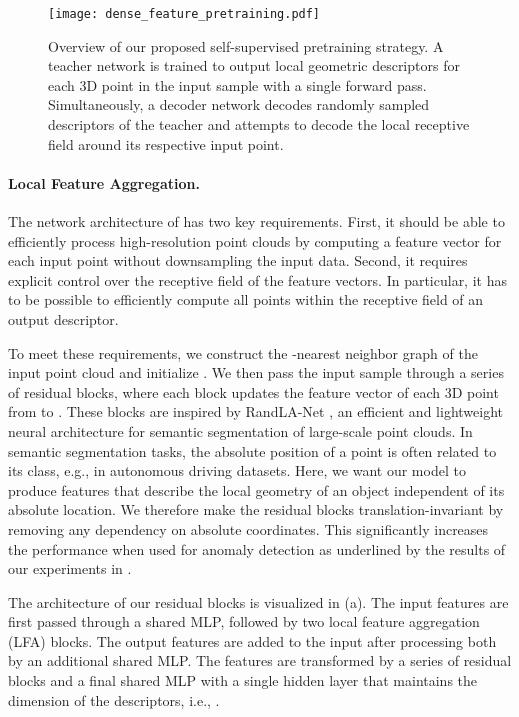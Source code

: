 \documentclass[twoside,11pt]{article}
\begin{document}
\begin{figure}[ht]
    \centering
\texttt{[image: dense\_feature\_pretraining.pdf]}
    \caption{Overview of our proposed self-supervised pretraining strategy. A teacher network is trained to output local geometric descriptors for each 3D point in the input sample with a single forward pass. Simultaneously, a decoder network decodes randomly sampled descriptors of the teacher and attempts to decode the local receptive field around its respective input point.}
    \label{fig:feature_pretraining}
\end{figure}

\paragraph{\textbf{Local Feature Aggregation.}} The network architecture of  has two key requirements. First, it should be able to efficiently process high-resolution point clouds by computing a feature vector for each input point without downsampling the input data. Second, it requires explicit control over the receptive field of the feature vectors. In particular, it has to be possible to efficiently compute all points within the receptive field of an output descriptor. 

To meet these requirements, we construct the -nearest neighbor graph of the input point cloud and initialize . We then pass the input sample through a series of residual blocks, where each block updates the feature vector of each 3D point  from  to . These blocks are inspired by RandLA-Net \citep{hu2019randla,hu2021learning}, an efficient and lightweight neural architecture for semantic segmentation of large-scale point clouds. In semantic segmentation tasks, the absolute position of a point is often related to its class, e.g., in autonomous driving datasets. Here, we want our model to produce features that describe the local geometry of an object independent of its absolute location. We therefore make the residual blocks translation-invariant by removing any dependency on absolute coordinates. This significantly increases the performance when used for anomaly detection as underlined by the results of our experiments in . 

The architecture of our residual blocks is visualized in (a). The input features are first passed through a shared MLP, followed by two local feature aggregation (LFA) blocks. The output features are added to the input after processing both by an additional shared MLP\@. The features are transformed by a series of residual blocks and a final shared MLP with a single hidden layer that maintains the dimension of the descriptors, i.e., .
\end{document}
